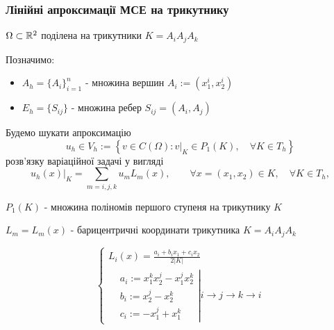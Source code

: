 \begin{frame}[allowframebreaks]
	\frametitle<presentation>{Лінійні апроксимації МСЕ на трикутнику}

	$\Omega \subset \mathbb{R}^2$ поділена на трикутники $K = A_iA_jA_k$

	Позначимо:

	\begin{itemize}
		\item  $A_h = \lbrace A_i \rbrace_{i=1}^n$ - множина вершин $A_i := (x_1^i, x_2^i)$
		\item $E_h = \lbrace S_{ij} \rbrace$ - множина ребер $S_{ij} = (A_i, A_j)$
	\end{itemize}

	\framebreak

		Будемо шукати апроксимацію
		\begin{equation}
			u_h \in V_h := \left\lbrace v \in C(\Omega) : v|_K \in P_1(K), \quad \forall K \in T_h \right\rbrace
		\end{equation}
		розв'язку варіаційної задачі у вигляді
		\begin{equation}\label{eq:appr_kind}
			u_h(x)|_K = \sum \limits_{m=i,j,k} u_m L_m (x), \qquad \forall x=(x_1, x_2) \in K, \quad \forall K \in T_h,
		\end{equation}

		$P_1(K)$ - множина поліномів першого ступеня на трикутнику $K$

	\framebreak

		$L_m = L_m(x)$ - барицентричні координати трикутника $K = A_i A_j A_k$

		\begin{equation}\label{eq:barycentric_coord}
			\begin{cases}
				L_i(x) = \frac{a_i + b_i x_1 + c_i x_2}{2 |K|} \\
					\left.
					\begin{split}
						&a_i := x_1^k x_2^j - x_1^j x_2^k \\
						&b_i := x_2^j -x_2^k \\
						&c_i := -x_1^j+x_1^k
					\end{split}
					\right|
					i \to j \to k \to i
			\end{cases}
		\end{equation}

	\end{frame}

